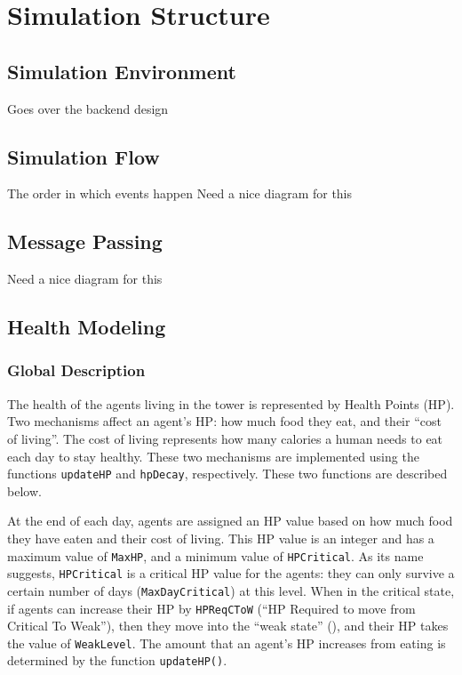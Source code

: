 \chapter{Simulation Structure}\label{simulation_structure}

\section{Simulation Environment}\label{simulation_environment}
Goes over the backend design

\section{Simulation Flow}\label{simulation_flow}
The order in which events happen
Need a nice diagram for this

\section{Message Passing}\label{message_passing}
Need a nice diagram for this

\section{Health Modeling}\label{health_modeling}


%
%
\subsection{Global Description}

The health of the agents living in the tower is represented by Health Points (HP). Two mechanisms affect an agent's HP: how much food they eat, and their ``cost of living''. The cost of living represents how many calories a human needs to eat each day to stay healthy. These two mechanisms are implemented using the functions \lstinline$updateHP$ and \lstinline$hpDecay$, respectively. These two functions are described below.

At the end of each day, agents are assigned an HP value based on how much food they have eaten and their cost of living. This HP value is an integer and has a maximum value of \lstinline$MaxHP$, and a minimum value of \lstinline$HPCritical$. As its name suggests, \lstinline$HPCritical$ is a critical HP value for the agents: they can only survive a certain number of days (\lstinline$MaxDayCritical$) at this level. When in the critical state, if agents can increase their HP by \lstinline$HPReqCToW$ (``HP Required to move from Critical To Weak''), then they move into the ``weak state'' (), and their HP takes the value of \lstinline$WeakLevel$. The amount that an agent's HP increases from eating is determined by the function \lstinline$updateHP()$.

